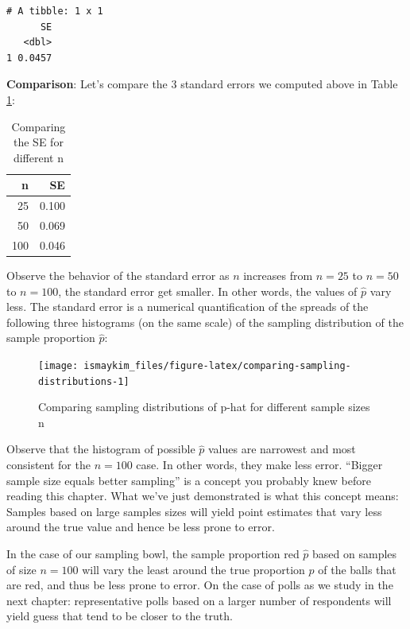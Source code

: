 \documentclass[12pt,]{krantz}
\theoremstyle{definition}
\theoremstyle{definition}
\theoremstyle{definition}
\theoremstyle{remark}
\begin{document}
\begin{verbatim}
# A tibble: 1 x 1
      SE
   <dbl>
1 0.0457
\end{verbatim}

\textbf{Comparison}: Let's compare the 3 standard errors we computed
above in Table \ref{tab:comparingn}:

\begin{table}[H]

\caption{\label{tab:comparingn}Comparing the SE for different n}
\centering
\fontsize{10}{12}\selectfont
\begin{tabular}[t]{rr}
\toprule
n & SE\\
\midrule
25 & 0.100\\
50 & 0.069\\
100 & 0.046\\
\bottomrule
\end{tabular}
\end{table}

Observe the behavior of the standard error as \(n\) increases from
\(n=25\) to \(n=50\) to \(n=100\), the standard error get smaller. In
other words, the values of \(\widehat{p}\) vary less. The standard error
is a numerical quantification of the spreads of the following three
histograms (on the same scale) of the sampling distribution of the
sample proportion \(\widehat{p}\):

\begin{figure}

{\centering \texttt{[image: ismaykim\_files/figure-latex/comparing-sampling-distributions-1]} 

}

\caption{Comparing sampling distributions of p-hat for different sample sizes n}\label{fig:comparing-sampling-distributions}
\end{figure}

Observe that the histogram of possible \(\widehat{p}\) values are
narrowest and most consistent for the \(n=100\) case. In other words,
they make less error. ``Bigger sample size equals better sampling'' is a
concept you probably knew before reading this chapter. What we've just
demonstrated is what this concept means: Samples based on large samples
sizes will yield point estimates that vary less around the true value
and hence be less prone to error.

In the case of our sampling bowl, the sample proportion red
\(\widehat{p}\) based on samples of size \(n=100\) will vary the least
around the true proportion \(p\) of the balls that are red, and thus be
less prone to error. On the case of polls as we study in the next
chapter: representative polls based on a larger number of respondents
will yield guess that tend to be closer to the truth.
\end{document}
